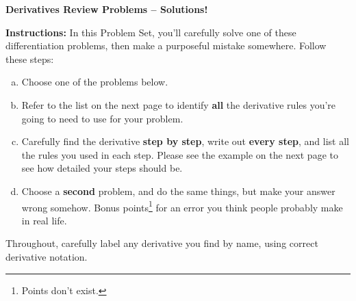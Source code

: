 \documentclass[letter, 12pt]{article}
\newenvironment{red}{ %
\color{red}}{\ignorespacesafterend
} %
\renewcommand{\section}[1]{\begin{center} \textbf{#1} \\\end{center}}
\begin{document}
\section{Derivatives Review Problems -- \begin{red}
Solutions!
\end{red}}

\textbf{Instructions:} 
In this Problem Set, you'll carefully solve one of these differentiation problems, then make a purposeful mistake somewhere. Follow these steps:
\begin{enumerate}[(a)]
	\item Choose one of the problems below.
	\item Refer to the list on the next page to identify \textbf{all} the derivative rules you're going to need to use for your problem.
	\item Carefully find the derivative \textbf{step by step}, write out \textbf{every step}, and list all the rules you used in each step. Please see the example on the next page to see how detailed your steps should be.
	\item Choose a \textbf{second} problem, and do the same things, but make your answer wrong somehow. Bonus points\footnote{Points don't exist.} for an error you think people probably make in real life.
\end{enumerate}
Throughout, carefully label any derivative you find by name, using correct derivative notation.

\hrulefill
\end{document}
